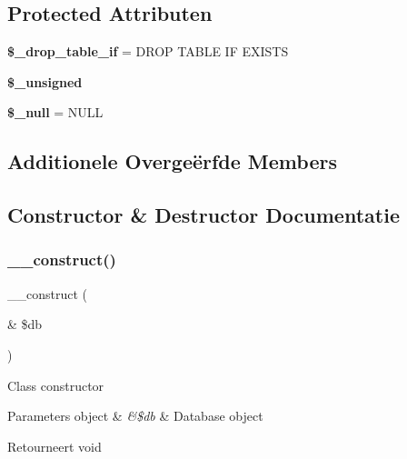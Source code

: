 \subsection*{Protected Attributen}
\begin{DoxyCompactItemize}
\item 
\mbox{\label{class_c_i___d_b__pdo__pgsql__forge_a92a8a9145a7fc91e252e58d019373581}} 
{\bfseries \$\+\_\+drop\+\_\+table\+\_\+if} = \textquotesingle{}D\+R\+OP T\+A\+B\+LE IF E\+X\+I\+S\+TS\textquotesingle{}
\item 
{\bfseries \$\+\_\+unsigned}
\item 
\mbox{\label{class_c_i___d_b__pdo__pgsql__forge_ae58fe6a5104d4a069a49b27533ce808f}} 
{\bfseries \$\+\_\+null} = \textquotesingle{}N\+U\+LL\textquotesingle{}
\end{DoxyCompactItemize}
\subsection*{Additionele Overge\"{e}rfde Members}


\subsection{Constructor \& Destructor Documentatie}
\mbox{\label{class_c_i___d_b__pdo__pgsql__forge_aaf2ef772755ec6f361d44e16cc9ffd69}} 
\subsubsection{\texorpdfstring{\_\_construct()}{\_\_construct()}}
{\footnotesize\ttfamily \+\_\+\+\_\+construct (\begin{DoxyParamCaption}\item[{\&}]{\$db }\end{DoxyParamCaption})}

Class constructor


\begin{DoxyParams}[1]{Parameters}
object & {\em \&\$db} & Database object \\
\hline
\end{DoxyParams}
\begin{DoxyReturn}{Retourneert}
void 
\end{DoxyReturn}


